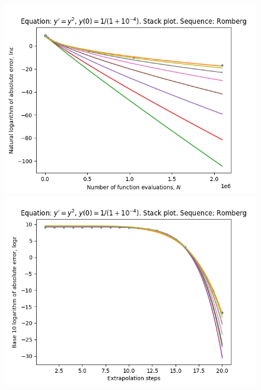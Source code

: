 \begin{figure}[H]
\centering
\begin{minipage}{0.45\textwidth}
\centering
\includegraphics[scale=0.45]{emr_plots/singularity_4_hp_romberg_stack.png}
\end{minipage}
\begin{minipage}{0.45\textwidth}
\centering
\includegraphics[scale=0.45]{emr_plots/singularity_4_hp_romberg_steps_stack.png}
\end{minipage}
\end{figure}

